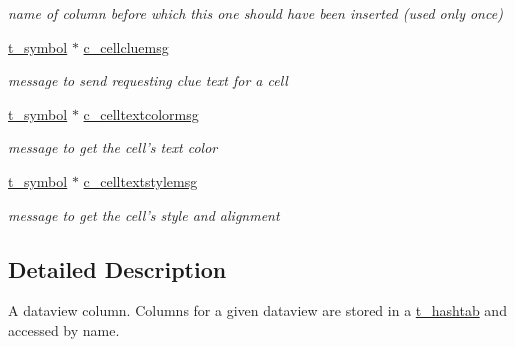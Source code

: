 \begin{DoxyCompactItemize}
\begin{DoxyCompactList}\small\item\em name of column before which this one should have been inserted (used only once) \item\end{DoxyCompactList}\item 
\hypertarget{structt__jcolumn_a76aa435d6de612259d506e26c919b0ff}{
\hyperlink{structt__symbol}{t\_\-symbol} $\ast$ \hyperlink{structt__jcolumn_a76aa435d6de612259d506e26c919b0ff}{c\_\-cellcluemsg}}
\label{structt__jcolumn_a76aa435d6de612259d506e26c919b0ff}

\begin{DoxyCompactList}\small\item\em message to send requesting clue text for a cell \item\end{DoxyCompactList}\item 
\hypertarget{structt__jcolumn_a1c31c35419154d008644340864427873}{
\hyperlink{structt__symbol}{t\_\-symbol} $\ast$ \hyperlink{structt__jcolumn_a1c31c35419154d008644340864427873}{c\_\-celltextcolormsg}}
\label{structt__jcolumn_a1c31c35419154d008644340864427873}

\begin{DoxyCompactList}\small\item\em message to get the cell's text color \item\end{DoxyCompactList}\item 
\hypertarget{structt__jcolumn_a5ffe36aef495294c74d68c1ff7fa4c53}{
\hyperlink{structt__symbol}{t\_\-symbol} $\ast$ \hyperlink{structt__jcolumn_a5ffe36aef495294c74d68c1ff7fa4c53}{c\_\-celltextstylemsg}}
\label{structt__jcolumn_a5ffe36aef495294c74d68c1ff7fa4c53}

\begin{DoxyCompactList}\small\item\em message to get the cell's style and alignment \item\end{DoxyCompactList}\end{DoxyCompactItemize}


\subsection{Detailed Description}
A dataview column. Columns for a given dataview are stored in a \hyperlink{structt__hashtab}{t\_\-hashtab} and accessed by name. 